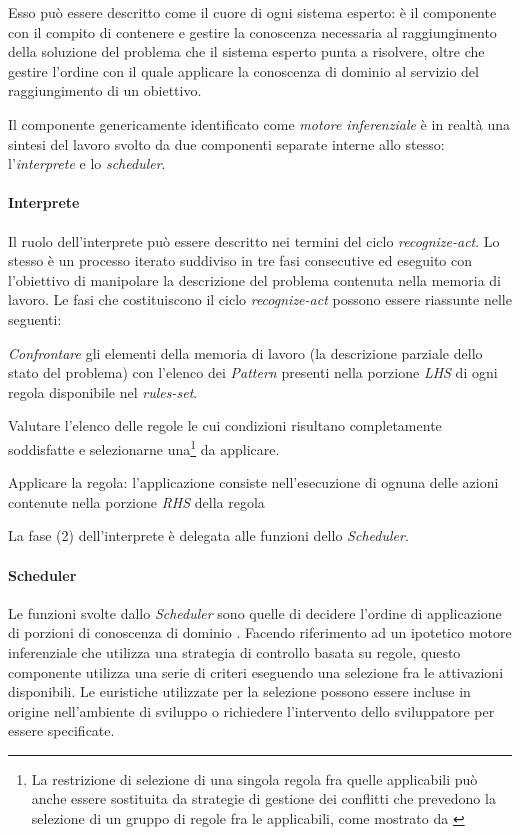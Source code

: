 Esso può essere descritto come il cuore di ogni sistema esperto: è il componente con il compito di contenere e gestire la conoscenza necessaria al raggiungimento della soluzione del problema che il sistema esperto punta a risolvere, oltre che gestire l'ordine con il quale applicare la conoscenza di dominio al servizio del raggiungimento di un obiettivo.

Il componente genericamente identificato come \emph{motore inferenziale} è in realtà una sintesi del lavoro svolto da due componenti separate interne allo stesso: l'\emph{interprete} e lo \emph{scheduler}\cite{development1993}.

\paragraph{Interprete} Il ruolo dell'interprete può essere descritto nei termini del ciclo \emph{recognize-act}. Lo stesso è un processo iterato suddiviso in tre fasi consecutive ed eseguito con l'obiettivo di manipolare la descrizione del problema contenuta nella memoria di lavoro. Le fasi che costituiscono il ciclo \emph{recognize-act} possono essere riassunte nelle seguenti:
\begin{list}{}{}
	\item[(1)] \emph{Confrontare} gli elementi della memoria di lavoro (la descrizione parziale dello stato del problema) con l'elenco dei \emph{Pattern} presenti nella porzione \emph{LHS} di ogni regola disponibile nel \emph{rules-set}.
	\item[(2)] Valutare l'elenco delle regole le cui condizioni risultano completamente soddisfatte e selezionarne una\footnote{La restrizione di selezione di una singola regola fra quelle applicabili può anche essere sostituita da strategie di gestione dei conflitti che prevedono la selezione di un gruppo di regole fra le applicabili, come mostrato da \cite{Doorenbos95productionmatching}} da applicare.
	\item[(3)] Applicare la regola: l'applicazione consiste nell'esecuzione di ognuna delle azioni contenute nella porzione \emph{RHS} della regola
\end{list}

La fase (2) dell'interprete è delegata alle funzioni dello \emph{Scheduler}. 

\paragraph{Scheduler} Le funzioni svolte dallo \emph{Scheduler} sono quelle di decidere l'ordine di applicazione di porzioni di conoscenza di dominio \cite{development1993}. Facendo riferimento ad un ipotetico motore inferenziale che utilizza una strategia di controllo basata su regole, questo componente utilizza una serie di criteri eseguendo una selezione fra le attivazioni disponibili. Le euristiche utilizzate per la selezione possono essere incluse in origine nell'ambiente di sviluppo o richiedere l'intervento dello sviluppatore per essere specificate.


